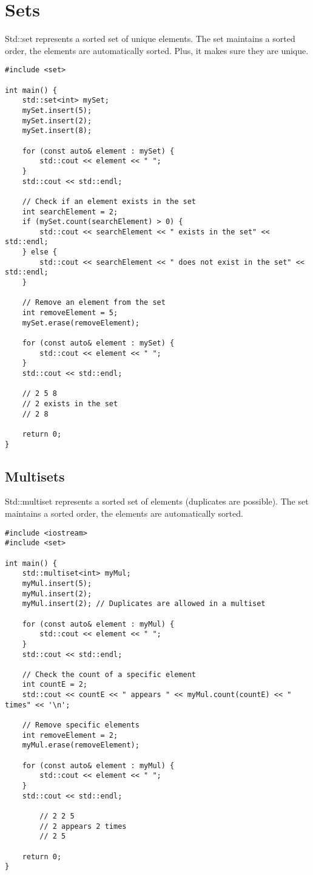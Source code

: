 \section{Sets}

Std::set represents a sorted set of unique elements. The set maintains a sorted order,
the elements are automatically sorted. Plus, it makes sure they are unique.

\begin{verbatim}
#include <set>

int main() {
    std::set<int> mySet;
    mySet.insert(5);
    mySet.insert(2);
    mySet.insert(8);

    for (const auto& element : mySet) {
        std::cout << element << " ";
    }
    std::cout << std::endl;

    // Check if an element exists in the set
    int searchElement = 2;
    if (mySet.count(searchElement) > 0) {
        std::cout << searchElement << " exists in the set" << std::endl;
    } else {
        std::cout << searchElement << " does not exist in the set" << std::endl;
    }

    // Remove an element from the set
    int removeElement = 5;
    mySet.erase(removeElement);

    for (const auto& element : mySet) {
        std::cout << element << " ";
    }
    std::cout << std::endl;
    
    // 2 5 8
    // 2 exists in the set
    // 2 8

    return 0;
}
\end{verbatim}

\subsection{Multisets}

Std::multiset represents a sorted set of elements (duplicates are possible). The set maintains a sorted order,
the elements are automatically sorted.

\begin{verbatim}
#include <iostream>
#include <set>

int main() {
    std::multiset<int> myMul;
    myMul.insert(5);
    myMul.insert(2);
    myMul.insert(2); // Duplicates are allowed in a multiset

    for (const auto& element : myMul) {
        std::cout << element << " ";
    }
    std::cout << std::endl;

    // Check the count of a specific element
    int countE = 2;
    std::cout << countE << " appears " << myMul.count(countE) << " times" << '\n';

    // Remove specific elements
    int removeElement = 2;
    myMul.erase(removeElement);

    for (const auto& element : myMul) {
        std::cout << element << " ";
    }
    std::cout << std::endl;

        // 2 2 5
        // 2 appears 2 times
        // 2 5 

    return 0;
}
\end{verbatim}

